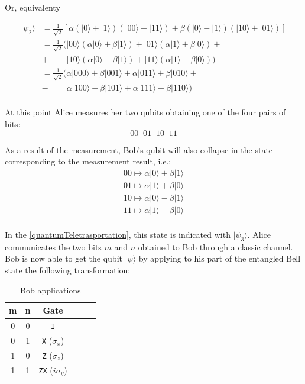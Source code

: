 \documentclass[a4paper,10pt]{article}
\begin{document}
Or, equivalenty

\begin{equation*}
\begin{split}
|\psi_2\rangle & = \frac{1}{\sqrt{2}}\left[\alpha(|0\rangle + |1\rangle) \left(|00\rangle + |11\rangle\right) + \beta(|0\rangle - |1\rangle) \left(|10\rangle + |01\rangle\right) \right] \\
 & = \frac{1}{\sqrt{2}}(|00\rangle(\alpha|0\rangle + \beta|1\rangle) + |01\rangle(\alpha|1\rangle + \beta|0\rangle) + \\
 & + \; \; \; \; \; \; \; \; |10\rangle(\alpha|0\rangle - \beta|1\rangle) + |11\rangle(\alpha|1\rangle - \beta|0\rangle)) \\
 & = \frac{1}{\sqrt{2}}(\alpha|000\rangle + \beta|001\rangle + \alpha|011\rangle +  \beta|010\rangle + \\
 & - \; \; \; \; \; \; \; \; \alpha|100\rangle - \beta|101\rangle + \alpha|111\rangle -
 \beta|110\rangle) \\
\end{split}
\end{equation*}

At this point Alice measures her two qubits obtaining one of the four pairs of bits:
$$00 \; \; 01 \; \; 10 \; \; 11$$

As a result of the measurement, Bob's qubit will also collapse in the state corresponding to the measurement result, i.e.:
\begin{equation*}
\begin{split}
00 \mapsto \alpha|0\rangle + \beta|1\rangle \\
01 \mapsto \alpha|1\rangle + \beta|0\rangle \\
10 \mapsto \alpha|0\rangle - \beta|1\rangle \\
11 \mapsto \alpha|1\rangle - \beta|0\rangle \\
\end{split}
\end{equation*}

In the \autoref{quantumTeletrasportation}, this state is indicated with $|\psi_3\rangle$. Alice communicates the two bits $m$ and $n$ obtained to Bob through a classic channel. Bob is now able to get the qubit $|\psi\rangle$ by applying to his part of the entangled Bell state the following transformation:
\begin{table}[!htb]
\centering
\begin{tabular}{|c|c|c|c|c|c|}
\hline
m & n & Gate \\ \hline
0 & 0 & \texttt{I} \\ \hline
0 & 1 & \texttt{X} ($\sigma_x$) \\ \hline
1 & 0 & \texttt{Z} ($\sigma_z$) \\ \hline
1 & 1 & \texttt{ZX} ($i\sigma_y$) \\ \hline
\end{tabular}
\caption{Bob applications}
\label{bobTeleportGates}
\end{table}
\end{document}
